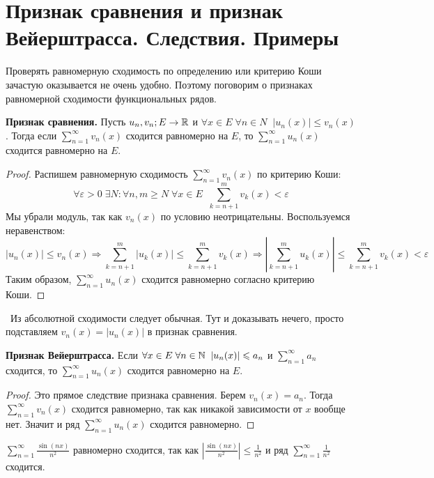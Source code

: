 \section{Признак сравнения и признак Вейерштрасса. Следствия. Примеры}
Проверять равномерную сходимость по определению или критерию Коши зачастую оказывается не очень удобно.
Поэтому поговорим о признаках равномерной сходимости функциональных рядов.

\textbf{Признак сравнения.}
Пусть $u_n, v_n; E \to \mathbb{R}$ и $\forall x \in E \; \forall n \in N \;\; |u_n(x)| \leqslant v_n(x)$.
Тогда если $\sum\limits_{n = 1}^\infty v_n(x)$ сходится равномерно на $E$, то $\sum\limits_{n = 1}^\infty u_n(x)$ сходится равномерно на $E$.

\begin{proof}
    Распишем равномерную сходимость $\sum\limits_{n = 1}^\infty v_n(x)$ по критерию Коши:
    \[ \forall \varepsilon > 0 \; \exists N : \forall n,m \geqslant N \; \forall x \in E \;\; \sum_{k=n+1}^m v_k(x) < \varepsilon \]
    \quad Мы убрали модуль, так как $v_n(x)$ по условию неотрицательны.
    Воспользуемся неравенством: \[ |u_n(x)| \leqslant v_n(x) \Longrightarrow \sum_{k = n + 1}^m |u_k(x)| \leqslant \sum_{k = n+1}^m v_k(x) \Longrightarrow \left| \sum_{k = n + 1}^m u_k(x) \right| \leqslant \sum_{k = n+1}^m v_k(x) < \varepsilon \]
    \quad Таким образом, $\sum\limits_{n = 1}^\infty u_n(x)$ сходится равномерно согласно критерию Коши.
\end{proof}

\follow \, Из абсолютной сходимости следует обычная.
Тут и доказывать нечего, просто подставляем $v_n(x) = |u_n(x)|$ в признак сравнения. 

\vspace*{7mm}

\textbf{Признак Вейерштрасса.} 
Если $\forall x \in E \; \forall n \in \mathbb{N} \;\; |u_n(x)| \leqslant a_n$ и $\sum\limits_{n = 1}^\infty a_n$ сходится, то $\sum\limits_{n = 1}^\infty u_n(x)$ сходится равномерно на $E$.
\begin{proof}
    Это прямое следствие признака сравнения.
    Берем $v_n(x) = a_n$. 
    Тогда $\sum\limits_{n = 1}^\infty v_n(x)$ сходится равномерно, так как никакой зависимости от $x$ вообще нет.
    Значит и ряд $\sum\limits_{n = 1}^\infty u_n(x)$ сходится равномерно.
\end{proof}

\begin{example}
    $\sum\limits_{n = 1}^\infty \frac{\sin(nx)}{n^2}$ равномерно сходится, так как $\left| \frac{\sin(nx)}{n^2} \right| \leqslant \frac{1}{n^2}$ и ряд $\sum\limits_{n = 1}^\infty \frac{1}{n^2}$ сходится.
\end{example}

